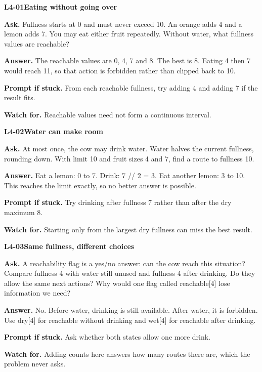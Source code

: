 \documentclass[11pt,a4paper]{article}
\begin{document}
\noindent\begin{minipage}{\textwidth}
{\color{teal}\textbf{L4-01}}\quad \textbf{Eating without going over}\par\smallskip
\textbf{Ask.} Fullness starts at 0 and must never exceed 10. An orange adds 4 and a lemon adds 7. You may eat either fruit repeatedly. Without water, what fullness values are reachable?\par\smallskip
\textbf{Answer.} The reachable values are 0, 4, 7 and 8. The best is 8. Eating 4 then 7 would reach 11, so that action is forbidden rather than clipped back to 10.\par\smallskip
\textbf{Prompt if stuck.} From each reachable fullness, try adding 4 and adding 7 if the result fits.\par\smallskip
\textbf{Watch for.} Reachable values need not form a continuous interval.
\end{minipage}\par{}\medskip

\noindent\begin{minipage}{\textwidth}
{\color{teal}\textbf{L4-02}}\quad \textbf{Water can make room}\par\smallskip
\textbf{Ask.} At most once, the cow may drink water. Water halves the current fullness, rounding down. With limit 10 and fruit sizes 4 and 7, find a route to fullness 10.\par\smallskip
\textbf{Answer.} Eat a lemon: 0 to 7. Drink: 7 // 2 = 3. Eat another lemon: 3 to 10. This reaches the limit exactly, so no better answer is possible.\par\smallskip
\textbf{Prompt if stuck.} Try drinking after fullness 7 rather than after the dry maximum 8.\par\smallskip
\textbf{Watch for.} Starting only from the largest dry fullness can miss the best result.
\end{minipage}\par{}\medskip

\noindent\begin{minipage}{\textwidth}
{\color{teal}\textbf{L4-03}}\quad \textbf{Same fullness, different choices}\par\smallskip
\textbf{Ask.} A reachability flag is a yes/no answer: can the cow reach this situation? Compare fullness 4 with water still unused and fullness 4 after drinking. Do they allow the same next actions? Why would one flag called reachable[4] lose information we need?\par\smallskip
\textbf{Answer.} No. Before water, drinking is still available. After water, it is forbidden. Use dry[4] for reachable without drinking and wet[4] for reachable after drinking.\par\smallskip
\textbf{Prompt if stuck.} Ask whether both states allow one more drink.\par\smallskip
\textbf{Watch for.} Adding counts here answers how many routes there are, which the problem never asks.
\end{minipage}\par{}\medskip
\end{document}

